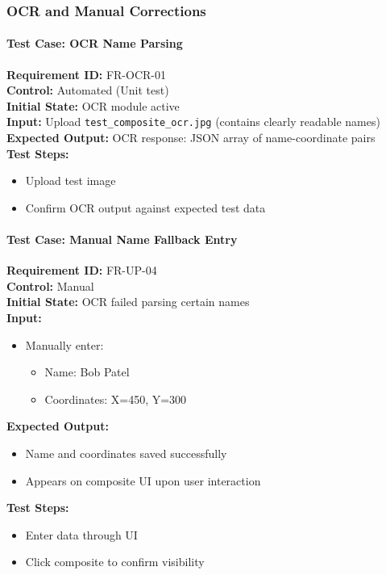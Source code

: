 \documentclass[12pt, titlepage]{article}
\begin{document}
\subsubsection{OCR and Manual Corrections}

\paragraph{Test Case: OCR Name Parsing}
\textbf{Requirement ID:} FR-OCR-01 \\
\textbf{Control:} Automated (Unit test) \\
\textbf{Initial State:} OCR module active \\
\textbf{Input:} Upload \texttt{test\_composite\_ocr.jpg} (contains clearly readable names) \\
\textbf{Expected Output:} OCR response: JSON array of name-coordinate pairs \\
\textbf{Test Steps:}
\begin{itemize}
    \item Upload test image
    \item Confirm OCR output against expected test data
\end{itemize}

\paragraph{Test Case: Manual Name Fallback Entry}
\textbf{Requirement ID:} FR-UP-04 \\
\textbf{Control:} Manual \\
\textbf{Initial State:} OCR failed parsing certain names \\
\textbf{Input:}
\begin{itemize}
    \item Manually enter:
    \begin{itemize}
        \item Name: Bob Patel
        \item Coordinates: X=450, Y=300
    \end{itemize}
\end{itemize}
\textbf{Expected Output:}
\begin{itemize}
    \item Name and coordinates saved successfully
    \item Appears on composite UI upon user interaction
\end{itemize}
\textbf{Test Steps:}
\begin{itemize}
    \item Enter data through UI
    \item Click composite to confirm visibility
\end{itemize}
\end{document}
